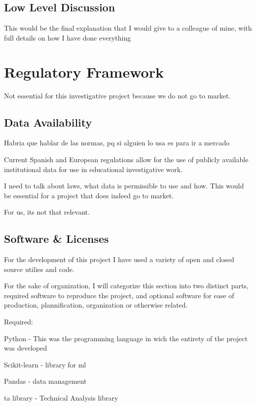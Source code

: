 \documentclass[12pt]{report} %
\begin{document}
\section{Low Level Discussion} %
This would be the final explanation that I would give to a colleague of mine, with full details on how I have done everything



\chapter{Regulatory Framework}
Not essential for this investigative project because we do not go to market.

\section{Data Availability}
Habria que hablar de las normas, pq si alguien lo usa es para ir a mercado

Current Spanish and European regulations allow for the use of publicly available institutional data for use in educational investigative work.

I need to talk about laws, what data is permissible to use and how. This would be essential for a project that does indeed go to market.

For us, its not that relevant.

\section{Software \& Licenses}

For the development of this project I have used a variety of open and closed source utilies and code.

For the sake of organization, I will categorize this section into two distinct parts, required software to reproduce the project, and optional software for ease of production, plannification, organization or otherwise related.

Required:

Python - This was the programming language in wich the entirety of the project was developed \cite{python}

Scikit-learn - library for ml \cite{scikit-learn}

Pandas - data management \cite{pandas}

ta library - Technical Analysis library\cite{ta-lib}
\end{document}
